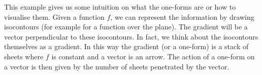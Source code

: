 \documentclass[11pt]{article}
\theoremstyle{plain}
\begin{document}
This example gives us some intuition on what the one-forms are or how to visualise them. Given a function $f$, we can represent the information by drawing isocontours (for example for a function over the plane). The gradient will be a vector perpendicular to these isocontours. In fact, we think about the isocontours themselves as a gradient. In this way the gradient (or a one-form) is a stack of sheets where $f$ is constant and a vector is an arrow. The action of a one-form on a vector is then given by the number of sheets penetrated by the vector.

\begin{figure}[h!]
\begin{centering}

\begin{tikzpicture}[x=0.70pt,y=0.70pt,yscale=-1,xscale=1]


\end{tikzpicture}
\end{centering}
\end{figure}
\end{document}
